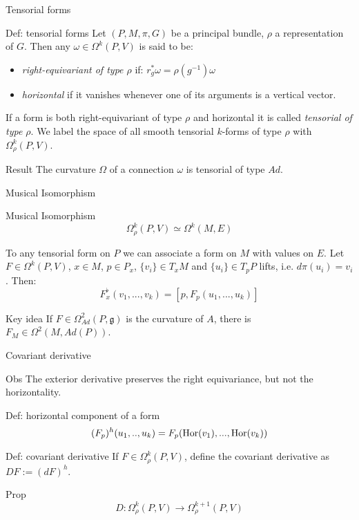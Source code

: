 \documentclass{beamer}
\begin{document}
\begin{frame}{Tensorial forms}
	\begin{exampleblock}{Def: tensorial forms}
		Let $(P,M,\pi,G)$ be a principal bundle, $\rho$ a representation of $G$. Then any $\omega\in\Omega^k(P,V)$ is said to be:
		\begin{itemize}
			\item \textit{right-equivariant of type $\rho$} if:
			$r^*_g\omega=\rho(g^{-1})\omega$
			\item \textit{horizontal} if it vanishes whenever one of its arguments is a vertical vector. 
		\end{itemize} If a form is both right-equivariant of type $\rho$ and horizontal it is called \textit{tensorial of type $\rho$}. We label the space of all smooth tensorial $k$-forms of type $\rho$ with $\Omega^k_\rho(P,V)$.
	\end{exampleblock}
	\begin{block}{Result}
		The curvature $\Omega$ of a connection $\omega$ is tensorial of type $Ad$.
	\end{block}
\end{frame}
\begin{frame}{Musical Isomorphism}
	\begin{alertblock}{Musical Isomorphism}
		$$\Omega^k_\rho(P,V)\simeq\Omega^k(M,E)$$
	\end{alertblock}
	To any tensorial form on $P$ we can associate a form on $M$ with values on $E$.
	Let $F\in\Omega^k(P,V)$, $x\in M$, $p\in P_x$, $\{v_i\}\in T_xM$ and $\{u_i\}\in T_pP$ lifts, i.e. $d\pi(u_i)=v_i$. Then:
	$$F^\flat_x(v_1,...,v_k)=[p,F_p(u_1,...,u_k)]$$
	\begin{alertblock}{Key idea}
		If $F\in\Omega^2_{Ad}(P,\mathfrak{g})$ is the curvature of $A$, there is $F_M\in\Omega^2(M,Ad(P))$.
	\end{alertblock}
\end{frame}
\begin{frame}{Covariant derivative}
	\begin{block}{Obs}
		The exterior derivative preserves the right equivariance, but not the horizontality.
	\end{block}
	\begin{exampleblock}{Def: horizontal component of a form}
		$$(F_p)^h(u_1,..,u_k)=F_p(\hbox{Hor}(v_1),...,\hbox{Hor}(v_k))$$
	\end{exampleblock}
	\begin{exampleblock}{Def: covariant derivative}
		If $F\in\Omega^k_\rho(P,V)$, define the covariant derivative as $DF:=(dF)^h$.
	\end{exampleblock}
	\begin{alertblock}{Prop}
		$$D:\Omega^k_\rho(P,V)\rightarrow \Omega^{k+1}_\rho(P,V)$$
	\end{alertblock}
\end{frame}
\end{document}
